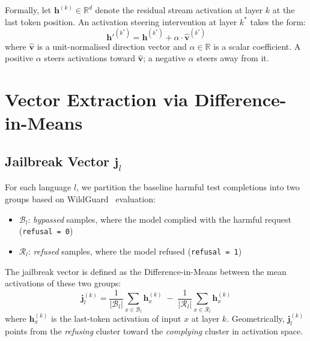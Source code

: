 Formally, let $\mathbf{h}^{(k)} \in \mathbb{R}^d$ denote the residual stream activation at layer $k$ at the last token position. An activation steering intervention at layer $k^*$ takes the form:
%
\begin{equation}
    \mathbf{h}'^{(k^*)} = \mathbf{h}^{(k^*)} + \alpha \cdot \hat{\mathbf{v}}^{(k^*)}
    \label{eq:intervention}
\end{equation}
%
where $\hat{\mathbf{v}}$ is a unit-normalised direction vector and $\alpha \in \mathbb{R}$ is a scalar coefficient. A positive $\alpha$ steers activations toward $\hat{\mathbf{v}}$; a negative $\alpha$ steers away from it.

\section{Vector Extraction via Difference-in-Means}
\label{sec:vectors}

\subsection{Jailbreak Vector \texorpdfstring{$\mathbf{j}_l$}{j\_l}}
\label{sec:jl}

For each language $l$, we partition the baseline harmful test completions into two groups based on WildGuard~\citep{han2024wildguard} evaluation:
%
\begin{itemize}[noitemsep]
    \item $\mathcal{B}_l$: \textit{bypassed} samples, where the model complied with the harmful request (\texttt{refusal\,=\,0})
    \item $\mathcal{R}_l$: \textit{refused} samples, where the model refused (\texttt{refusal\,=\,1})
\end{itemize}
%
The jailbreak vector is defined as the Difference-in-Means between the mean activations of these two groups:
%
\begin{equation}
    \mathbf{j}_l^{(k)} =
        \frac{1}{|\mathcal{B}_l|} \sum_{x \in \mathcal{B}_l} \mathbf{h}_x^{(k)}
        \;-\;
        \frac{1}{|\mathcal{R}_l|} \sum_{x \in \mathcal{R}_l} \mathbf{h}_x^{(k)}
    \label{eq:jl}
\end{equation}
%
where $\mathbf{h}_x^{(k)}$ is the last-token activation of input $x$ at layer $k$. Geometrically, $\mathbf{j}_l^{(k)}$ points from the \textit{refusing} cluster toward the \textit{complying} cluster in activation space.

